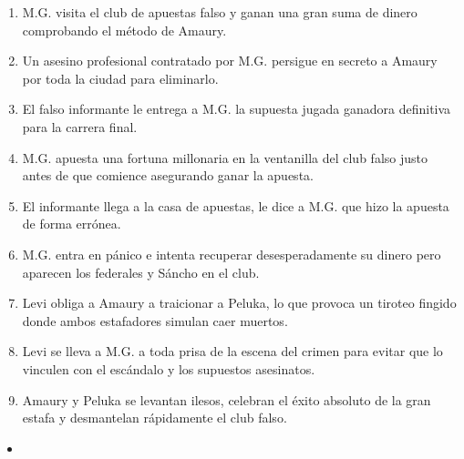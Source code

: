 \begin{enumerate}
    \item M.G.  visita el club de apuestas falso y ganan una gran suma de dinero comprobando el método de Amaury. 
    \item Un asesino profesional contratado por M.G. persigue en secreto a Amaury por toda la ciudad para eliminarlo.
    \item El falso informante  le entrega a M.G. la supuesta jugada ganadora definitiva para la carrera final.
    \item M.G. apuesta una fortuna millonaria en la ventanilla del club falso justo antes de que comience asegurando ganar la apuesta. 
    \item El informante llega a la casa de apuestas, le dice a M.G. que hizo la apuesta de forma errónea.
    \item M.G. entra en pánico e intenta recuperar desesperadamente su dinero pero aparecen los federales  y Sáncho en el club.
    \item Levi obliga a Amaury a traicionar a Peluka, lo que provoca un tiroteo fingido donde ambos estafadores simulan caer muertos.
    \item Levi se lleva a M.G. a toda prisa de la escena del crimen para evitar que lo vinculen con el escándalo y los supuestos asesinatos.
    \item Amaury y Peluka se levantan ilesos, celebran el éxito absoluto de la gran estafa y desmantelan rápidamente el club falso.
\end{enumerate}

\begin{itemize}
    \item 
\end{itemize}
